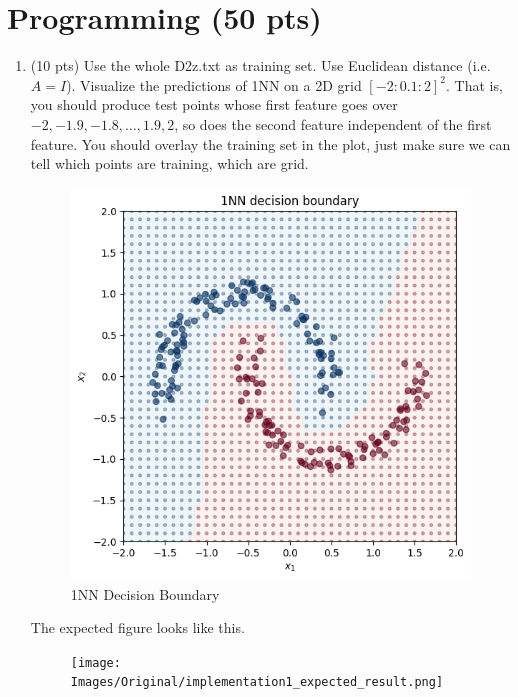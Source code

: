 \documentclass[a4paper]{article}
\theoremstyle{definition}
\newenvironment{soln}{
    \leavevmode\color{blue}\ignorespaces
}{}
\begin{document}
\section{Programming (50 pts)}
\begin{enumerate}
	\item (10 pts) Use the whole D2z.txt as training set.  Use Euclidean distance (i.e. $A=I$).
	Visualize the predictions of 1NN on a 2D grid $[-2:0.1:2]^2$.
	That is, you should produce test points whose first feature goes over $-2, -1.9, -1.8, \ldots, 1.9, 2$, so does the second feature independent of the first feature.
	You should overlay the training set in the plot, just make sure we can tell which points are training, which are grid.
    \begin{soln}
        \begin{figure}[h]
		\centering
		\includegraphics[scale=0.4]{Images/1NN.png}
            \caption{1NN Decision Boundary}
            \label{fig:1nndb}
	\end{figure}
    \end{soln}
	
	The expected figure looks like this.
	\begin{figure}[h]
		\centering
		\texttt{[image: Images/Original/implementation1\_expected\_result.png]}
	\end{figure}
	

\end{enumerate}
\end{document}
